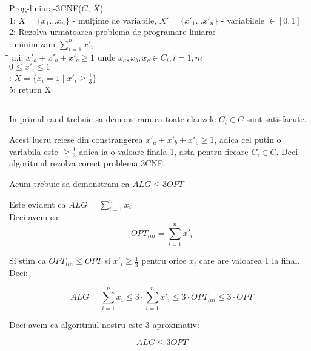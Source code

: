 \documentclass[a4paper]{report} %
\begin{document}
\begin{tabbing}
Prog-liniara-3CNF($C$, $X$)\\
1: $X=\{x_{1}\dots x_{n}\}$ - mulțime de variabile, $X'=\{x'_{1}\dots x'_{n}\}$ - variabilele $\in [0,1]$ \\ 
2: Rezolva urmatoarea problema de programare liniara:\\
\hspace{2em}\= : \> minimizam $\sum_{i=1}^{n}x'_{i}$ \\
\hspace{2em}\=\hspace{2em}\= \kill 
\> a.i. \> $x'_{a}+x'_{b}+x'_{c}\geq 1 \text{ unde } x_{a},x_{b},x_{c}\in C_{i}, i=\overline{1,m}$ \\
\> \> $0\leq x'_{i}\leq 1$\\
\hspace{2em}\=: $X=\{x_{i}=1 \mid x'_{i}\geq \frac{1}{3}\}$\\
5: return X
\end{tabbing}

\subsection{}

In primul rand trebuie sa demonstram ca toate clauzele $C_{i}\in C$ sunt satisfacute.

Acest lucru reiese din constrangerea $x'_{a}+x'_{b}+x'_{c}\geq 1$, adica cel putin o variabila este $\geq \frac{1}{3}$
adica ia o valoare finala 1, asta pentru fiecare $C_{i}\in C$. Deci algoritmul rezolva corect problema 3CNF.

Acum trebuie sa demonstram ca $ALG\leq 3OPT$

Este evident ca $ALG=\sum_{i=1}^{n}x_{i}$\\

Deci avem ca \[OPT_{lin}=\sum_{i=1}^{n}x'_{i}\]

Si stim ca $OPT_{lin}\leq OPT$ si $x'_{i}\geq \frac{1}{3}$ pentru orice $x_{i}$ care are valoarea 1 la final. Deci:

\[ALG=\sum_{i=1}^{n}x_{i}\leq 3\cdot \sum_{i=1}^{n}x'_{i}\leq 3\cdot OPT_{lin} \leq 3\cdot OPT\]

Deci avem ca algoritmul nostru este 3-aproximativ:

\[ALG\leq 3OPT\]
\end{document}
